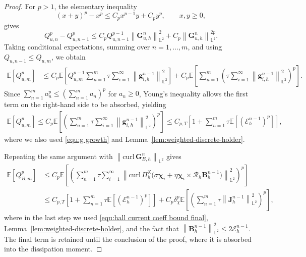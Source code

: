 \documentclass[10pt,a4paper]{amsart}
\newcommand{\bb}{\mathbb}
\newcommand{\bff}{\boldsymbol}
\newcommand{\curl}{\mathrm{curl}\,}
\newcommand{\norm}[2]{\left\|{#1}\right\|_{#2}}
\begin{document}
\begin{proof}
	For $p>1$, the elementary inequality
	\[
	(x+y)^p-x^p
	\le
	C_px^{p-1}y+C_py^p,
	\qquad x,y\ge0,
	\]
	gives
	\[
	Q_{u,n}^p-Q_{u,n-1}^p
	\le
	C_pQ_{u,n-1}^{p-1}
	\norm{\bff G_{u,h}^n}{\bb L^2}^2
	+
	C_p\norm{\bff G_{u,h}^n}{\bb L^2}^{2p}.
	\]
	Taking conditional expectations, summing over $n=1,\ldots,m$, and using
	$Q_{u,n-1}\le Q_{u,m}$, we obtain
	\begin{align*}
		\bb E[Q_{u,m}^p]
		&\le
		C_p\bb E\left[
		Q_{u,m}^{p-1}
		\sum_{n=1}^{m}\tau
		\sum_{i=1}^{\infty}
		\norm{\bff g_{i,h}^{n-1}}{\bb L^2}^2
		\right]
		+
		C_p\bb E\left[
		\sum_{n=1}^{m}
		\left(
		\tau\sum_{i=1}^{\infty}
		\norm{\bff g_{i,h}^{n-1}}{\bb L^2}^2
		\right)^p
		\right].
	\end{align*}
	Since $\sum_{n=1}^{m}a_n^p
	\le
	\left(\sum_{n=1}^{m}a_n\right)^p$ for $a_n\ge0$,
	Young's inequality allows the first term on the right-hand side to be absorbed, yielding
	\begin{align}
		\label{equ:Q u p bound revised}
		\bb E[Q_{u,m}^p]
		\le
		C_p\bb E\left[
		\left(
		\sum_{n=1}^{m}\tau
		\sum_{i=1}^{\infty}
		\norm{\bff g_{i,h}^{n-1}}{\bb L^2}^2
		\right)^p
		\right]
		\le
		C_{p,T}
		\left[
		1+
		\sum_{n=1}^{m}\tau
		\bb E\left[(\mathcal E_h^{n-1})^p\right]
		\right],
	\end{align}
	where we also used \eqref{equ:g growth} and
	Lemma~\ref{lem:weighted-discrete-holder}.

	
	Repeating the same argument with
	$\norm{\curl\bff G_{B,h}^n}{\bb L^2}$ gives
	\begin{align}\label{equ:Q B p bound revised}
		\bb E[Q_{B,m}^p]
		&\le
		C_p\bb E\left[
		\left(
		\sum_{n=1}^{m}\tau
		\sum_{i=1}^{\infty}
		\norm{
			\curl\Pi_h^{\bb X}
			\bigl(
			\sigma\bff\chi_i
			+
			\eta\bff\chi_i\times\mathcal R_h\bff B_h^{n-1}
			\bigr)}
		{\bb L^2}^2
		\right)^p
		\right]
		\nonumber\\
		&\leq
		C_{p,T}
		\left[
		1+
		\sum_{n=1}^{m}\tau
		\bb E\left[(\mathcal E_h^{n-1})^p\right]
		\right]
		+
		C_p\delta_\chi^p
		\bb E\left[
		\left(
		\sum_{n=1}^{m}\tau
		\norm{\bff J_h^{n-1}}{\bb L^2}^2
		\right)^p
		\right],
	\end{align}
	where in the last step we used \eqref{equ:hall current coeff bound final}, Lemma~\ref{lem:weighted-discrete-holder}, and the fact that
	$\norm{\bff B_h^{n-1}}{\bb L^2}^2\le2\mathcal E_h^{n-1}$.
	The final term is retained until the conclusion of the proof, where it is absorbed into the dissipation moment.


\end{proof}
\end{document}
